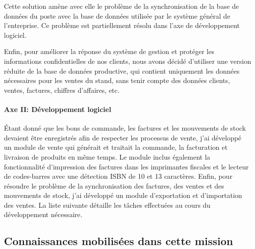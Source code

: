 \documentclass{resume} %
\begin{document}
Cette solution amène avec elle le problème de la synchronisation de la base de données du poste avec la base de données utilisée par le système général de l'entreprise. Ce problème est partiellement résolu dans l'axe de développement logiciel.

Enfin, pour améliorer la réponse du système de gestion et protéger les informations confidentielles de nos clients, nous avons décidé d'utiliser une version réduite de la base de données productive, qui contient uniquement les données nécessaires pour les ventes du stand, sans tenir compte des données clients, ventes, factures, chiffres d'affaires, etc.
	
		\paragraph{Axe II: Développement logiciel}	
Étant donné que les bons de commande, les factures et les mouvements de stock devaient être enregistrés  afin de respecter les processus de vente, j'ai développé un module de vente qui générait et traitait la commande, la facturation et livraison de produits en même temps.
Le module inclus également la fonctionnalité d'impression des factures dans les imprimantes fiscales et le lecteur de codes-barres avec une détection ISBN de 10 et 13 caractères.
Enfin, pour résoudre le problème de la synchronisation des factures, des ventes et des mouvements de stock, j'ai développé un module d'exportation et d'importation des ventes.
La liste suivante détaille les tâches effectuées au cours du développement nécessaire.

	\subsection {Connaissances mobilisées dans cette mission }
			
\end{document}
